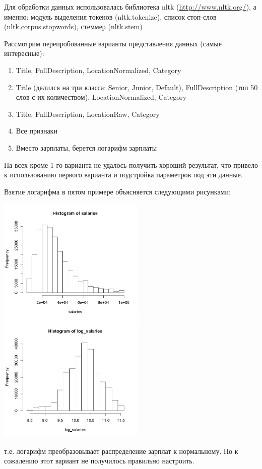 \documentclass[12pt, a4paper]{article}
\begin{document}
        Для обработки данных использовалась библиотека nltk (\url{http://www.nltk.org/}), а именно: модуль выделения токенов (nltk.tokenize), список стоп-слов (nltk.corpus.stopwords), стеммер (nltk.stem)

        Рассмотрим перепробованные варианты представления данных (самые интересные):
        \begin{enumerate}
            \item Title, FullDescription, LocationNormalized, Category
            \item Title (делился на три класса: Senior, Junior, Default), FullDescription (топ 50 слов с их количеством), LocationNormalized, Category
            \item Title, FullDescription, LocationRaw, Category
            \item Все признаки
            \item Вместо зарплаты, берется логарифм зарплаты
        \end{enumerate}

        На всех кроме 1-го варианта не удалось получить хороший результат, что привело к использованию первого варианта и подстройка параметров под эти данные.

        Взятие логарифма в пятом примере объясняется следующими рисунками:
        \begin{center}
            \includegraphics[width=7cm]{salaries_histogram.png}
            \includegraphics[width=7cm]{log_salaries_histogram.png}
        \end{center}
        т.е. логарифм преобразовывает распределение зарплат к нормальному. Но к сожалению этот вариант не получилось правильно настроить.
\end{document}
